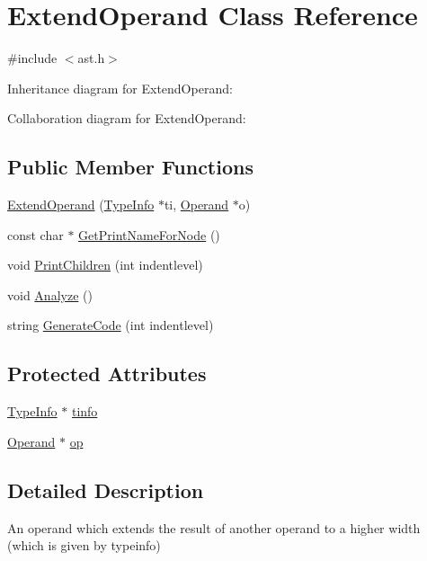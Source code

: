 \hypertarget{class_extend_operand}{}\section{Extend\+Operand Class Reference}
\label{class_extend_operand}


{\ttfamily \#include $<$ast.\+h$>$}



Inheritance diagram for Extend\+Operand\+:


Collaboration diagram for Extend\+Operand\+:
\subsection*{Public Member Functions}
\begin{DoxyCompactItemize}
\item 
\hyperlink{class_extend_operand_acf52217cacec2d8ff3ad0f1e659bc41d}{Extend\+Operand} (\hyperlink{class_type_info}{Type\+Info} $\ast$ti, \hyperlink{class_operand}{Operand} $\ast$o)
\item 
const char $\ast$ \hyperlink{class_extend_operand_ac5848e09b0f85359a5640d2d721b39be}{Get\+Print\+Name\+For\+Node} ()
\item 
void \hyperlink{class_extend_operand_afdf1598c150fdcf76f97b2e48f5c2a40}{Print\+Children} (int indentlevel)
\item 
void \hyperlink{class_extend_operand_ad8496c498f62dd060ea265eff6ec72da}{Analyze} ()
\item 
string \hyperlink{class_extend_operand_a42bd225e28413b11c5caa6f7f83de37d}{Generate\+Code} (int indentlevel)
\end{DoxyCompactItemize}
\subsection*{Protected Attributes}
\begin{DoxyCompactItemize}
\item 
\hyperlink{class_type_info}{Type\+Info} $\ast$ \hyperlink{class_extend_operand_abe2019abb3a9e61cb5d9a7b962eb223d}{tinfo}
\item 
\hyperlink{class_operand}{Operand} $\ast$ \hyperlink{class_extend_operand_a3070ccb0d6648ae1c98d54fa4134a483}{op}
\end{DoxyCompactItemize}


\subsection{Detailed Description}
An operand which extends the result of another operand to a higher width (which is given by typeinfo) 

